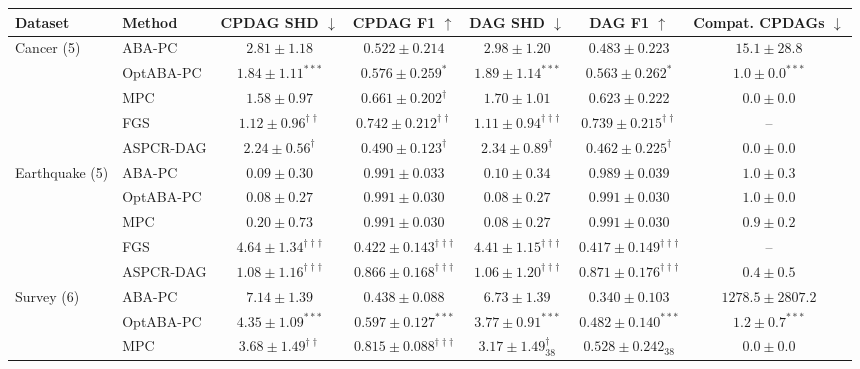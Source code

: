 \begin{table}[t]
\centering
\scriptsize
\setlength{\tabcolsep}{3pt}
\begin{tabular}{llccccc}
\toprule
Dataset & Method & CPDAG SHD $\downarrow$ & CPDAG F1 $\uparrow$ & DAG SHD $\downarrow$ & DAG F1 $\uparrow$ & Compat. CPDAGs $\downarrow$\\
\midrule
Cancer (5) & ABA-PC & $2.81\pm1.18$ & $0.522\pm0.214$ & $2.98\pm1.20$ & $0.483\pm0.223$ & $15.1\pm28.8$\\
 & OptABA-PC & $\mathbf{1.84\pm1.11}^{***}$ & $\mathbf{0.576\pm0.259}^{*}$ & $\mathbf{1.89\pm1.14}^{***}$ & $\mathbf{0.563\pm0.262}^{*}$ & $\mathbf{1.0\pm0.0}^{***}$\\
 & MPC & $1.58\pm0.97$ & $\mathbf{0.661\pm0.202}^{\dagger}$ & $1.70\pm1.01$ & $0.623\pm0.222$ & $0.0\pm0.0$\\
 & FGS & $\mathbf{1.12\pm0.96}^{\dagger\dagger}$ & $\mathbf{0.742\pm0.212}^{\dagger\dagger}$ & $\mathbf{1.11\pm0.94}^{\dagger\dagger\dagger}$ & $\mathbf{0.739\pm0.215}^{\dagger\dagger}$ & --\\
 & ASPCR-DAG & $2.24\pm0.56^{\dagger}$ & $0.490\pm0.123^{\dagger}$ & $2.34\pm0.89^{\dagger}$ & $0.462\pm0.225^{\dagger}$ & $0.0\pm0.0$\\
\midrule
Earthquake (5) & ABA-PC & $0.09\pm0.30$ & $0.991\pm0.033$ & $0.10\pm0.34$ & $0.989\pm0.039$ & $1.0\pm0.3$\\
 & OptABA-PC & $0.08\pm0.27$ & $0.991\pm0.030$ & $0.08\pm0.27$ & $0.991\pm0.030$ & $1.0\pm0.0$\\
 & MPC & $0.20\pm0.73$ & $0.991\pm0.030$ & $0.08\pm0.27$ & $0.991\pm0.030$ & $0.9\pm0.2$\\
 & FGS & $4.64\pm1.34^{\dagger\dagger\dagger}$ & $0.422\pm0.143^{\dagger\dagger\dagger}$ & $4.41\pm1.15^{\dagger\dagger\dagger}$ & $0.417\pm0.149^{\dagger\dagger\dagger}$ & --\\
 & ASPCR-DAG & $1.08\pm1.16^{\dagger\dagger\dagger}$ & $0.866\pm0.168^{\dagger\dagger\dagger}$ & $1.06\pm1.20^{\dagger\dagger\dagger}$ & $0.871\pm0.176^{\dagger\dagger\dagger}$ & $0.4\pm0.5$\\
\midrule
Survey (6) & ABA-PC & $7.14\pm1.39$ & $0.438\pm0.088$ & $6.73\pm1.39$ & $0.340\pm0.103$ & $1278.5\pm2807.2$\\
 & OptABA-PC & $\mathbf{4.35\pm1.09}^{***}$ & $\mathbf{0.597\pm0.127}^{***}$ & $\mathbf{3.77\pm0.91}^{***}$ & $\mathbf{0.482\pm0.140}^{***}$ & $\mathbf{1.2\pm0.7}^{***}$\\
 & MPC & $\mathbf{3.68\pm1.49}^{\dagger\dagger}$ & $\mathbf{0.815\pm0.088}^{\dagger\dagger\dagger}$ & $\mathbf{3.17\pm1.49}^{\dagger}_{38}$ & $0.528\pm0.242_{38}$ & $0.0\pm0.0$\\

\end{tabular}
\end{table}
